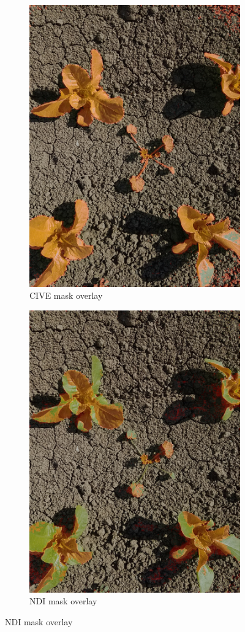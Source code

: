 \documentclass[letterpaper]{article}
\begin{document}
{\begin{figure}[H]
	\centering
	\begin{subfigure}[t]{.40\textwidth}
	  \centering
	  \includegraphics[width=.8\textwidth]{figures/overlay-cive.jpg}
	  \caption{CIVE mask overlay}
	  \label{fig:overlay-cive}
	\end{subfigure}
	\begin{subfigure}[t]{.40\textwidth}
	  \centering
	  \includegraphics[width=.8\textwidth]{figures/overlay-ndi.jpg}
	  \caption{NDI mask overlay}
	  \label{fig:overlay-ndi}
	\end{subfigure}


\end{figure}}
\end{document}
